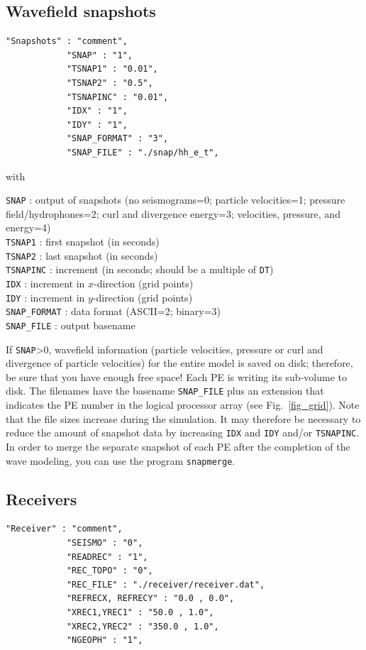 \subsection{Wavefield snapshots}
\begin{verbatim}
"Snapshots" : "comment",
            "SNAP" : "1",
            "TSNAP1" : "0.01",
            "TSNAP2" : "0.5",
            "TSNAPINC" : "0.01",
            "IDX" : "1",
            "IDY" : "1",
            "SNAP_FORMAT" : "3",
            "SNAP_FILE" : "./snap/hh_e_t",
\end{verbatim}

with

\texttt{SNAP} : output of snapshots (no seismograms=0; particle velocities=1; pressure field/hydrophones=2; curl and divergence energy=3; velocities, pressure, and energy=4)\\
\texttt{TSNAP1} : first snapshot (in seconds)\\
\texttt{TSNAP2} : last snapshot (in seconds)\\
\texttt{TSNAPINC} : increment (in seconds; should be a multiple of \texttt{DT})\\
\texttt{IDX} : increment in $x$-direction (grid points)\\
\texttt{IDY} : increment in $y$-direction (grid points)\\
\texttt{SNAP\_FORMAT} : data format (ASCII=2; binary=3)\\
\texttt{SNAP\_FILE} : output basename

If \texttt{SNAP}>0, wavefield information (particle velocities, pressure or curl and divergence of particle velocities) for the entire model is saved on disk; therefore, be sure that you have enough free space! Each PE is writing its sub-volume to disk. The filenames have the basename \texttt{SNAP\_FILE} plus an extension that indicates the PE number in the logical processor array (see Fig.~\ref{fig_grid}). Note that the file sizes increase during the simulation. It may therefore be necessary to reduce the amount of snapshot data by increasing \texttt{IDX} and \texttt{IDY} and/or \texttt{TSNAPINC}. In order to merge the separate snapshot of each PE after the completion of the wave modeling, you can use the program \texttt{snapmerge}.

\subsection{Receivers}
\begin{verbatim}
"Receiver" : "comment",
            "SEISMO" : "0",
            "READREC" : "1",
            "REC_TOPO" : "0",
            "REC_FILE" : "./receiver/receiver.dat",
            "REFRECX, REFRECY" : "0.0 , 0.0",
            "XREC1,YREC1" : "50.0 , 1.0",
            "XREC2,YREC2" : "350.0 , 1.0",
            "NGEOPH" : "1",
\end{verbatim}

